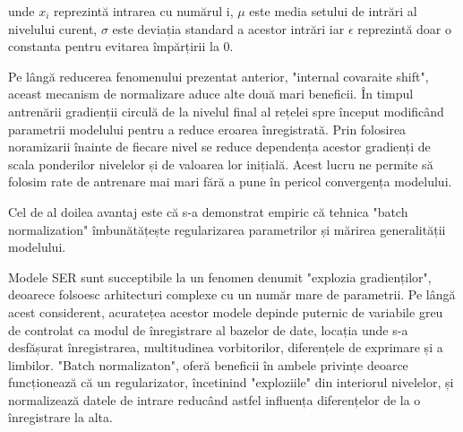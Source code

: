 \documentclass[a4paper,12pt]{book}
\begin{document}
				\quad unde $x_i$ reprezintă intrarea cu numărul i, $\mu$ este media setului de intrări al nivelului curent, $\sigma$ este deviația standard a acestor intrări iar $\epsilon$ reprezintă doar o constanta pentru evitarea împărțirii la 0.
				
				Pe lângă reducerea fenomenului prezentat anterior, "internal covaraite shift", aceast mecanism de normalizare aduce alte două mari beneficii. În timpul antrenării gradienții circulă de la nivelul final al rețelei spre început modificând parametrii modelului pentru a reduce eroarea înregistrată.
				Prin folosirea noramizarii înainte de fiecare nivel se reduce dependența acestor gradienți de scala ponderilor nivelelor și de valoarea lor inițială. Acest lucru ne permite să folosim rate de antrenare mai mari fără a pune în pericol convergența modelului. \par
				Cel de al doilea avantaj este că s-a demonstrat empiric \cite{batch_norm} că tehnica "batch normalization" îmbunătățește regularizarea parametrilor și mărirea generalității modelului. \par
				Modele SER sunt succeptibile la un fenomen denumit "explozia gradienților", deoarece folsoesc arhitecturi complexe cu un număr mare de parametrii. Pe lângă acest considerent, acuratețea acestor modele depinde puternic de variabile greu de controlat ca modul de înregistrare al bazelor de date, locația unde s-a desfășurat înregistrarea, multitudinea vorbitorilor, diferențele de exprimare și a limbilor. "Batch normalizaton", oferă beneficii în ambele privințe deoarce funcționează că un regularizator, încetinind "exploziile" din interiorul nivelelor, și normalizează datele de intrare reducând astfel influența diferențelor de la o înregistrare la alta. \par
\end{document}
